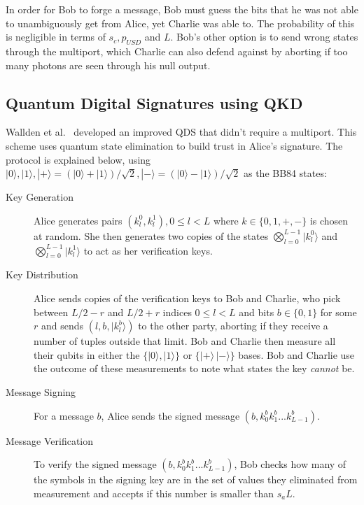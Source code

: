 \documentclass[%
 reprint,
 amsmath,amssymb,
 aps,
 pra,
]{revtex4-1}
\begin{document}
In order for Bob to forge a message, Bob must guess the bits that he was not able to unambiguously get from Alice, yet Charlie was able to. The probability of this is negligible in terms of $s_c, p_{USD}$ and $L$. Bob's other option is to send wrong states through the multiport, which Charlie can also defend against by aborting if too many photons are seen through his null output.

\subsection{Quantum Digital Signatures using QKD}
\label{ssec:qds-using-qkd}

Wallden et al.\ \cite{PhysRevA.91.042304} developed an improved QDS that didn't require a multiport. This scheme uses quantum state elimination \cite{PhysRevA.89.022336} to build trust in Alice's signature. The protocol is explained below, using $|0\rangle, |1\rangle, |+\rangle = (|0\rangle + |1\rangle)/\sqrt{2}, |-\rangle = (|0\rangle - |1\rangle)/\sqrt{2}$ as the BB84 \cite{BB84} states:

\begin{description}
\item[Key Generation]Alice generates pairs $(k^0_l, k^1_l), 0 \leq l < L$ where $k \in \{0, 1, +, -\}$ is chosen at random. She then generates two copies of the states $\bigotimes_{l=0}^{L-1}|k^0_l\rangle$ and $\bigotimes_{l=0}^{L-1}|k^1_l\rangle$ to act as her verification keys.
\item[Key Distribution]Alice sends copies of the verification keys to Bob and Charlie, who pick between $L/2-r$ and $L/2+r$ indices $0 \leq l < L$ and bits $b \in \{0, 1\}$ for some $r$ and sends $(l, b, |k^b_l\rangle)$ to the other party, aborting if they receive a number of tuples outside that limit. Bob and Charlie then measure all their qubits in either the $\{|0\rangle, |1\rangle\}$ or $\{|+\rangle\, |-\rangle\}$ bases. Bob and Charlie use the outcome of these measurements to note what states the key \textit{cannot} be.
\item[Message Signing]For a message $b$, Alice sends the signed message $(b, k^b_0k^b_1...k^b_{L-1})$.
\item[Message Verification]To verify the signed message $(b, k^b_0k^b_1...k^b_{L-1})$, Bob checks how many of the symbols in the signing key are in the set of values they eliminated from measurement and accepts if this number is smaller than $s_aL$.
\end{description}
\end{document}
